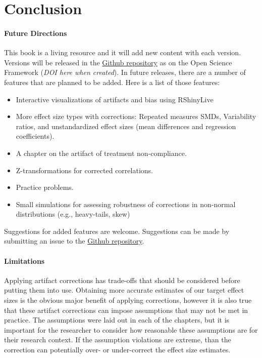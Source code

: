 \documentclass[
  letterpaper,
  DIV=11,
  numbers=noendperiod]{scrreprt}
\providecommand{\tightlist}{%
  \setlength{\itemsep}{0pt}\setlength{\parskip}{0pt}}\usepackage{longtable,booktabs,array}
\begin{document}
\hypertarget{conclusion-1}{%
\chapter{Conclusion}\label{conclusion-1}}

\hypertarget{future-directions}{%
\subsubsection*{Future Directions}\label{future-directions}}

This book is a living resource and it will add new content with each
version. Versions will be released in the
\href{https://github.com/MatthewBJane/artifact-corrections-for-effect-sizes/}{Github
repository} as on the Open Science Framework (\emph{DOI here when
created}). In future releases, there are a number of features that are
planned to be added. Here is a list of those features:

\begin{itemize}
\tightlist
\item
  Interactive visualizations of artifacts and bias using RShinyLive
\item
  More effect size types with corrections: Repeated measures SMDs,
  Variability ratios, and unstandardized effect sizes (mean differences
  and regression coefficients).
\item
  A chapter on the artifact of treatment non-compliance.
\item
  Z-transformations for corrected correlations.
\item
  Practice problems.
\item
  Small simulations for assessing robustness of corrections in
  non-normal distributions (e.g., heavy-tails, skew)
\end{itemize}

Suggestions for added features are welcome. Suggestions can be made by
submitting an issue to the
\href{https://github.com/MatthewBJane/artifact-corrections-for-effect-sizes/}{Github
repository}.

\hypertarget{limitations}{%
\subsubsection*{Limitations}\label{limitations}}

Applying artifact corrections has trade-offs that should be considered
before putting them into use. Obtaining more accurate estimates of our
target effect sizes is the obvious major benefit of applying
corrections, however it is also true that these artifact corrections can
impose assumptions that may not be met in practice. The assumptions were
laid out in each of the chapters, but it is important for the researcher
to consider how reasonable these assumptions are for their research
context. If the assumption violations are extreme, than the correction
can potentially over- or under-correct the effect size estimates.
\end{document}
